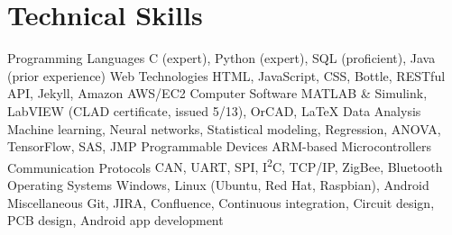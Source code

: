 \section{Technical Skills}
\begin{cvskills}
  \cvskill
    {Programming Languages}
    {C (expert), Python (expert), SQL (proficient), Java (prior experience)}
  \cvskill
    {Web Technologies}
    {HTML, JavaScript, CSS, Bottle, RESTful API, Jekyll, Amazon AWS/EC2}
  \cvskill
    {Computer Software}
    {MATLAB \& Simulink, LabVIEW (CLAD certificate, issued 5/13), OrCAD, LaTeX}
  \cvskill
    {Data Analysis}
    {Machine learning, Neural networks, Statistical modeling, Regression, ANOVA, TensorFlow, SAS, JMP}
  \cvskill
    {Programmable Devices}
    {ARM-based Microcontrollers}
  \cvskill
    {Communication Protocols}
    {CAN, UART, SPI, I\textsuperscript{2}C, TCP/IP, ZigBee, Bluetooth}
  \cvskill
    {Operating Systems}
    {Windows, Linux (Ubuntu, Red Hat, Raspbian), Android}
  \cvskill
    {Miscellaneous}
    {Git, JIRA, Confluence, Continuous integration, Circuit design, PCB design, Android app development}
\end{cvskills} 
